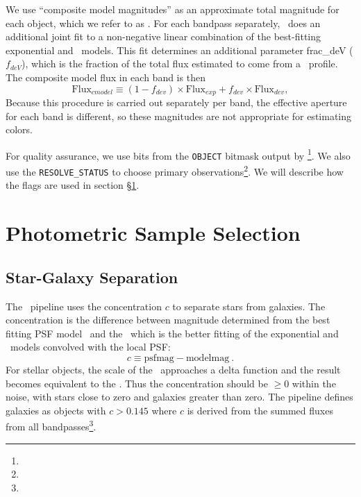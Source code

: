 \documentclass[12pt,preprint]{aastex}
\begin{document}
We use ``composite model magnitudes'' as an approximate total magnitude for
each object, which we refer to as \cmodelmag.  For each bandpass
separately, \photo\ does an additional joint fit to a non-negative
linear combination of the  best-fitting exponential and \devauc\
models. This fit determines an additional parameter {\sc frac\_deV}
($f_{deV}$), which is the fraction of the total flux estimated to come
from a \devauc\ profile.  The composite model flux in each band is then 
\begin{equation}
\textrm{Flux}_{cmodel} \equiv (1-f_{dev})\times \textrm{Flux}_{exp} + f_{dev} \times \textrm{Flux}_{dev},
\end{equation}
Because this procedure is carried out separately per band, the effective aperture for each band is
different, so these magnitudes are not appropriate for estimating colors.

For quality assurance, we use bits from the \texttt{OBJECT} bitmask output by
\photo \footnote{\DRateflags}.    We also use the \texttt{RESOLVE\_STATUS} to
choose primary observations\footnote{\DRateresolve}.  We will describe how the
flags are used in section \S \ref{sec:select}.

    

\section{Photometric Sample Selection} \label{sec:select}

\subsection{Star-Galaxy Separation} \label{sec:sg}

The \photo\ pipeline uses the concentration $c$ to separate stars from
galaxies.  The concentration is the difference between magnitude determined
from the best fitting PSF model \psfmag\ and the \modelmag\, which is
the better fitting of the exponential and \devauc\ models convolved
with the local PSF:
\begin{equation}
c \equiv \textrm{psfmag} - \textrm{modelmag}~.
\end{equation}
For stellar objects, the scale of the \modelmag\ approaches a delta function and
the result becomes equivalent to the \psfmag.  Thus the concentration should be
$\ge 0$ within the noise, with stars close to zero and galaxies greater than
zero.  The pipeline defines galaxies as objects with $c > 0.145$ where $c$ is
derived from the summed fluxes from all bandpasses\footnote{\DRateclass}.  
\end{document}
